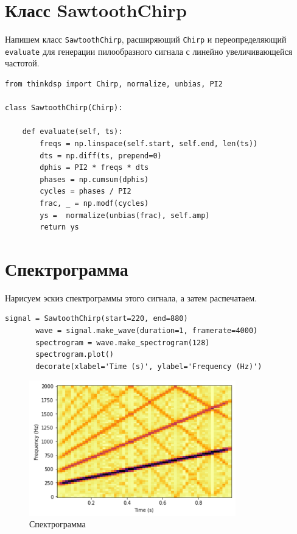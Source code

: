 \documentclass[a4paper,12pt]{report}
\begin{document}
\section{Класс SawtoothChirp}
    Напишем класс \texttt{SawtoothChirp}, расширяющий \texttt{Chirp} и переопределяющий \texttt{evaluate} для генерации пилообразного сигнала с линейно увеличивающейся частотой.
\begin{lstlisting}[caption=Класс SawtoothChirp]
from thinkdsp import Chirp, normalize, unbias, PI2

class SawtoothChirp(Chirp):

    def evaluate(self, ts):
        freqs = np.linspace(self.start, self.end, len(ts))
        dts = np.diff(ts, prepend=0)
        dphis = PI2 * freqs * dts
        phases = np.cumsum(dphis)
        cycles = phases / PI2
        frac, _ = np.modf(cycles)
        ys =  normalize(unbias(frac), self.amp)
        return ys
\end{lstlisting}
\section{Спектрограмма}
    Нарисуем эскиз спектрограммы этого сигнала, а затем распечатаем. 
\begin{lstlisting}[caption=Создание спектрограммы]
       signal = SawtoothChirp(start=220, end=880)
       wave = signal.make_wave(duration=1, framerate=4000)
       spectrogram = wave.make_spectrogram(128)
       spectrogram.plot()
       decorate(xlabel='Time (s)', ylabel='Frequency (Hz)')
\end{lstlisting}
\begin{figure}[H]
        \centering
        \includegraphics[width=0.8\textwidth]{fig2-1.PNG}
        \caption{Спектрограмма}
        \label{fig:fig2-1}
\end{figure}
    
\end{document}
